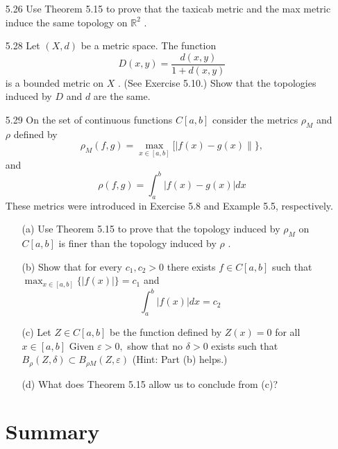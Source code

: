 \documentclass[12pt]{article}
\begin{document}
\begin{enumerate}
\begin{enumerate}
	\end{enumerate}
	
	\item[5.26] Use Theorem 5.15 to prove that the taxicab metric and the max metric induce
	the same topology on $\mathbb { R } ^ { 2 }$ .
	
	\item[5.28] Let $( X , d )$ be a metric space. The function
		\[D ( x , y ) = \frac { d ( x , y ) } { 1 + d ( x , y ) }\]
	is a bounded metric on $X$ . (See Exercise 5.10.) Show that the topologies
	induced by $D$ and $d$ are the same.
	
	\item[5.29] On the set of continuous functions $C [ a , b ]$ consider the metrics $\rho _ { M }$ and $\rho$ defined by
	\[\rho _ { M } ( f , g ) = \max _ { x \in [ a , b ] } [ | f ( x ) - g ( x ) \| \} ,\] and
	\[\rho ( f , g ) = \int _ { a } ^ { b } | f ( x ) - g ( x ) | d x\]
	These metrics were introduced in Exercise 5.8 and Example 5.5, respectively.
	\begin{enumerate}
		\item[(a)] Use Theorem 5.15 to prove that the topology induced by $\rho _ { M }$ on $C [ a , b ]$ is finer than the topology induced by $\rho$ .
		\item[(b)] Show that for every $c _ { 1 } , c _ { 2 } > 0$ there exists $f \in C [ a , b ]$ such that\\
		$\max _ { x \in [ a , b ] } \{ | f ( x ) | \} = c _ { 1 }$ and
		\[\int _ { a } ^ { b } | f ( x ) | d x = c _ { 2 }\]
		\item[(c)] Let $Z \in C [ a , b ]$ be the function defined by $Z ( x ) = 0$ for all $x \in [ a , b ]$
		Given $\varepsilon > 0 ,$ show that no $\delta > 0$ exists such that $B _ { \rho } ( Z , \delta ) \subset B _ { \rho M} ( Z , \varepsilon )$
		(Hint: Part (b) helps.)
		\item[(d)] What does Theorem 5.15 allow us to conclude from (c)?
	\end{enumerate}

	\section*{Summary}

\end{enumerate}
 
\end{document}

